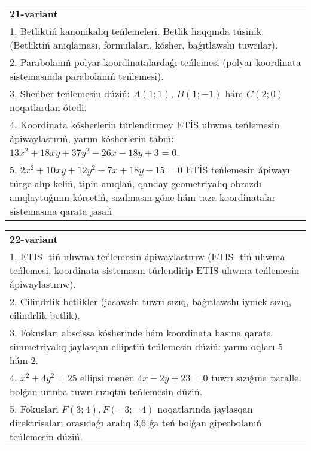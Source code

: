 \documentclass{article}
\begin{document}
\begin{tabular}{m{17cm}}
\textbf{21-variant}\\
1. Betliktiń kanonikalıq teńlemeleri. Betlik haqqında túsinik. (Betliktiń anıqlaması, formulaları, kósher, baǵıtlawshı tuwrılar).\\

2. Parabolanıń polyar koordinatalardaǵı teńlemesi (polyar koordinata sistemasında parabolanıń teńlemesi).\\

3. Sheńber teńlemesin dúziń: $A (1;1) $, $B (1;-1) $ hám $C (2;0) $ noqatlardan ótedi.\\

4. Koordinata kósherlerin túrlendirmey ETİS ulıwma teńlemesin ápiwaylastırıń, yarım kósherlerin tabıń: $13x^{2} + 18xy + 37y^{2} - 26x - 18y + 3 = 0$.  \\

5. $2x^{2} + 10xy + 12y^{2} - 7x + 18y - 15 = 0$ ETİS teńlemesin ápiwayı túrge alıp keliń, tipin anıqlań, qanday geometriyalıq obrazdı anıqlaytuǵının kórsetiń, sızılmasın góne hám taza koordinatalar sistemasına qarata jasań  
\end{tabular}
\vspace{1cm}


\begin{tabular}{m{17cm}}
\textbf{22-variant}\\
1. ETIS -tiń ulıwma teńlemesin ápiwaylastırıw (ETIS -tiń ulıwma teńlemesi, koordinata sistemasın túrlendirip ETIS ulıwma teńlemesin ápiwaylastırıw).\\

2. Cilindrlik betlikler (jasawshı tuwrı sızıq, baǵıtlawshı iymek sızıq, cilindrlik betlik).\\

3. Fokusları abscissa kósherinde hám koordinata basına qarata simmetriyalıq jaylasqan ellipstiń teńlemesin dúziń: yarım oqları 5 hám 2.\\

4. $x^{2} + 4y^{2} = 25$ ellipsi menen $4x - 2y + 23 = 0$ tuwrı sızıǵına parallel bolǵan urınba tuwrı sızıqtıń teńlemesin dúziń.  \\

5. Fokuslari $F(3;4), F(-3;-4)$ noqatlarında jaylasqan direktrisaları orasıdaǵı aralıq 3,6 ǵa teń bolǵan giperbolanıń teńlemesin dúziń.  
\end{tabular}
\vspace{1cm}
\end{document}
